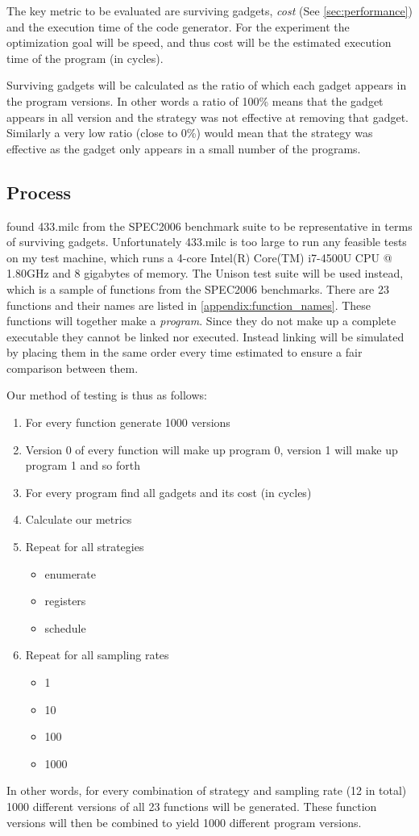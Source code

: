 The key metric to be evaluated are surviving gadgets, \textit{cost} (See
\ref{sec:performance}) and the execution time of the code generator. For the experiment
the optimization goal will be speed, and thus cost will be the estimated execution time of
the program (in cycles).

Surviving gadgets will be calculated as the ratio of which each gadget appears in the program
versions. In other words a ratio of 100\% means that the gadget appears in all version
and the strategy was not effective at removing that gadget. Similarly a very low ratio
(close to 0\%) would mean that the strategy was effective as the gadget only appears in
a small number of the programs.

\subsection{Process}

\textcite{large-scale-automated} found 433.milc from the SPEC2006 benchmark suite to be
representative in terms of surviving gadgets. Unfortunately 433.milc is too large to run
any feasible tests on my test machine, which runs a 4-core Intel(R) Core(TM) i7-4500U CPU
@ 1.80GHz and 8 gigabytes of memory. The Unison test suite will be used instead, which is
a sample of functions from the SPEC2006 benchmarks. There are 23 functions and their names
are listed in \ref{appendix:function_names}. These functions will together make a
\textit{program}. Since they do not make up a complete executable they cannot be linked
nor executed. Instead linking will be simulated by placing them in the same order every time
estimated to ensure a fair comparison between them.

Our method of testing is thus as follows:

\begin{enumerate}
	\item For every function generate 1000 versions
	\item Version 0 of every function will make up program 0, version 1 will make up program
		1 and so forth
	\item For every program find all gadgets and its cost (in cycles)
	\item Calculate our metrics
	\item Repeat for all strategies
		\begin{itemize}
			\item enumerate
			\item registers
			\item schedule
		\end{itemize}
	\item Repeat for all sampling rates
		\begin{itemize}
			\item 1
			\item 10
			\item 100
			\item 1000
		\end{itemize}
\end{enumerate}

In other words, for every combination of strategy and sampling rate (12 in total) 1000
different versions of all 23 functions will be generated. These function versions will
then be combined to yield 1000 different program versions.
